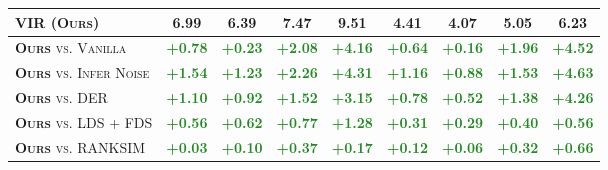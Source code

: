 \begin{table}[tbp]
\begin{adjustbox}{valign=t}
\begin{minipage}{0.49\textwidth}
\begin{center}
{\begin{tabular}{l|cccc|cccc}
\textsc{VIR (Ours)} & \textbf{6.99} & \textbf{6.39} & \textbf{7.47} & \textbf{9.51} & \textbf{4.41} & \textbf{4.07} & \textbf{5.05} & \textbf{6.23} \\[1.5pt] \midrule\midrule
\textsc{\textbf{Ours} vs. Vanilla} & \textcolor{ForestGreen}{\textbf{+0.78}} & \textcolor{ForestGreen}{\textbf{+0.23}} & \textcolor{ForestGreen}{\textbf{+2.08}} & \textcolor{ForestGreen}{\textbf{+4.16}} & \textcolor{ForestGreen}{\textbf{+0.64}} & \textcolor{ForestGreen}{\textbf{+0.16}} & \textcolor{ForestGreen}{\textbf{+1.96}} & \textcolor{ForestGreen}{\textbf{+4.52}}  \\[1.5pt]
\textsc{\textbf{Ours} vs. Infer Noise} & \textcolor{ForestGreen}{\textbf{+1.54}} & \textcolor{ForestGreen}{\textbf{+1.23}} & \textcolor{ForestGreen}{\textbf{+2.26}} & \textcolor{ForestGreen}{\textbf{+4.31}} & \textcolor{ForestGreen}{\textbf{+1.16}} & \textcolor{ForestGreen}{\textbf{+0.88}} & \textcolor{ForestGreen}{\textbf{+1.53}} & \textcolor{ForestGreen}{\textbf{+4.63}}  \\[1.5pt]
\textsc{\textbf{Ours} vs. DER} & \textcolor{ForestGreen}{\textbf{+1.10}} & \textcolor{ForestGreen}{\textbf{+0.92}} & \textcolor{ForestGreen}{\textbf{+1.52}} & \textcolor{ForestGreen}{\textbf{+3.15}} & \textcolor{ForestGreen}{\textbf{+0.78}} & \textcolor{ForestGreen}{\textbf{+0.52}} & \textcolor{ForestGreen}{\textbf{+1.38}} & \textcolor{ForestGreen}{\textbf{+4.26}}  \\[1.5pt]
\textsc{\textbf{Ours} vs. LDS + FDS} & \textcolor{ForestGreen}{\textbf{+0.56}} & \textcolor{ForestGreen}{\textbf{+0.62}} & \textcolor{ForestGreen}{\textbf{+0.77}} & \textcolor{ForestGreen}{\textbf{+1.28}} & \textcolor{ForestGreen}{\textbf{+0.31}} & \textcolor{ForestGreen}{\textbf{+0.29}} & \textcolor{ForestGreen}{\textbf{+0.40}} & \textcolor{ForestGreen}{\textbf{+0.56}}  \\[1.5pt]
\textsc{\textbf{Ours} vs. RANKSIM} & \textcolor{ForestGreen}{\textbf{+0.03}} & \textcolor{ForestGreen}{\textbf{+0.10}} & \textcolor{ForestGreen}{\textbf{+0.37}} & \textcolor{ForestGreen}{\textbf{+0.17}} & \textcolor{ForestGreen}{\textbf{+0.12}} & \textcolor{ForestGreen}{\textbf{+0.06}} & \textcolor{ForestGreen}{\textbf{+0.32}} & \textcolor{ForestGreen}{\textbf{+0.66}} \\
\bottomrule[1.5pt]
\end{tabular}
}
\end{center}
\vspace{-0.5cm}
\end{minipage}
\end{adjustbox}

\end{table}
